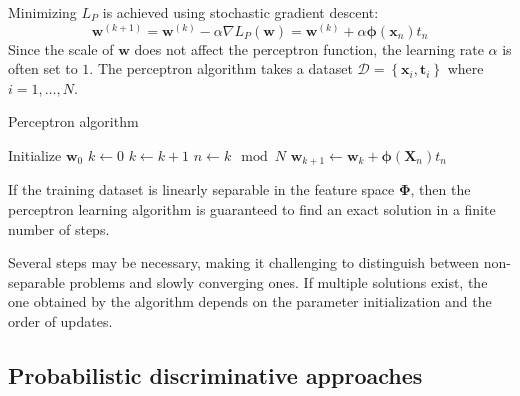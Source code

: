 Minimizing $L_P$ is achieved using stochastic gradient descent:
\[\textbf{w}^{(k+1)}=\textbf{w}^{(k)}-\alpha\nabla L_P(\textbf{w})=\textbf{w}^{(k)}+\alpha\boldsymbol{\phi}(\textbf{x}_n)t_n\]
Since the scale of $\textbf{w}$ does not affect the perceptron function, the learning rate $\alpha$ is often set to $1$. 
The perceptron algorithm takes a dataset $\mathcal{D}=\left\{ \textbf{x}_i,\textbf{t}_i  \right\}$ where $i=1,\dots,N$. 
\begin{algorithm}[H]
    \caption{Perceptron algorithm}
        \begin{algorithmic}[1]
            \State Initialize $\textbf{w}_0$
            \State $k \leftarrow 0$
            \Repeat
                \State $k \leftarrow k+1$
                \State $n \leftarrow k \mod N$
                    \State $\textbf{w}_{k+1} \leftarrow \textbf{w}_k + \boldsymbol{\phi}(\textbf{X}_n)t_n$
                \EndIf
        \end{algorithmic}
\end{algorithm}
\begin{theorem}
    If the training dataset is linearly separable in the feature space $\boldsymbol{\Phi}$, then the perceptron learning algorithm is guaranteed to find an exact solution in a finite number of steps.
\end{theorem}
Several steps may be necessary, making it challenging to distinguish between non-separable problems and slowly converging ones. 
If multiple solutions exist, the one obtained by the algorithm depends on the parameter initialization and the order of updates.

\subsection{Probabilistic discriminative approaches}